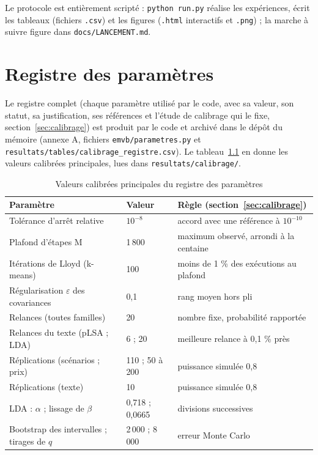 Le protocole est entièrement scripté : \texttt{python run.py} réalise les expériences, écrit les tableaux (fichiers \texttt{.csv}) et les figures (\texttt{.html} interactifs et \texttt{.png}) ; la marche à suivre figure dans \texttt{docs/LANCEMENT.md}.

\chapter{Registre des paramètres}
Le registre complet (chaque paramètre utilisé par le code, avec sa valeur, son statut, sa justification, ses références et l'étude de calibrage qui le fixe, section~\ref{sec:calibrage}) est produit par le code et archivé dans le dépôt du mémoire (annexe A, fichiers \texttt{emvb/parametres.py} et \texttt{resultats/tables/calibrage\_registre.csv}). Le tableau~\ref{tab:registre_resume} en donne les valeurs calibrées principales, lues dans \texttt{resultats/calibrage/}.

\begin{table}[H]
\centering
\small
\begin{tabular}{@{}lll@{}}
\toprule
\textbf{Paramètre} & \textbf{Valeur} & \textbf{Règle (section~\ref{sec:calibrage})} \\
\midrule
Tolérance d'arrêt relative & $10^{-8}$ & accord avec une référence à $10^{-10}$ \\
Plafond d'étapes M & 1\,800 & maximum observé, arrondi à la centaine \\
Itérations de Lloyd (k-means) & 100 & moins de 1 \% des exécutions au plafond \\
Régularisation $\varepsilon$ des covariances & 0,1 & rang moyen hors pli \\
Relances (toutes familles) & 20 & nombre fixe, probabilité rapportée \\
Relances du texte (pLSA ; LDA) & 6 ; 20 & meilleure relance à 0,1 \% près \\
Réplications (scénarios ; prix) & 110 ; 50 à 200 & puissance simulée 0,8 \\
Réplications (texte) & 10 & puissance simulée 0,8 \\
LDA : $\alpha$ ; lissage de $\beta$ & 0,718 ; 0,0665 & divisions successives \\
Bootstrap des intervalles ; tirages de $q$ & 2\,000 ; 8\,000 & erreur Monte Carlo \\
\bottomrule
\end{tabular}
\caption{Valeurs calibrées principales du registre des paramètres}\label{tab:registre_resume}
\end{table}

